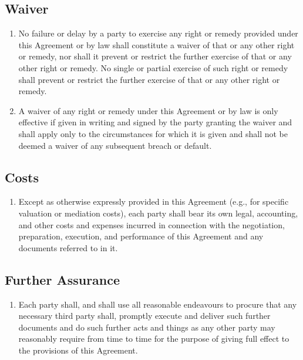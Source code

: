 \subsection{Waiver}
\begin{enumerate}[label=(\alph*)]
\item No failure or delay by a party to exercise any right or remedy provided under this Agreement or by law shall constitute a waiver of that or any other right or remedy, nor shall it prevent or restrict the further exercise of that or any other right or remedy. No single or partial exercise of such right or remedy shall prevent or restrict the further exercise of that or any other right or remedy.
\item A waiver of any right or remedy under this Agreement or by law is only effective if given in writing and signed by the party granting the waiver and shall apply only to the circumstances for which it is given and shall not be deemed a waiver of any subsequent breach or default.
\end{enumerate}

\subsection{Costs}
\begin{enumerate}[label=(\alph*)]
\item Except as otherwise expressly provided in this Agreement (e.g., for specific valuation or mediation costs), each party shall bear its own legal, accounting, and other costs and expenses incurred in connection with the negotiation, preparation, execution, and performance of this Agreement and any documents referred to in it.
\end{enumerate}

\subsection{Further Assurance}
\begin{enumerate}[label=(\alph*)]
\item Each party shall, and shall use all reasonable endeavours to procure that any necessary third party shall, promptly execute and deliver such further documents and do such further acts and things as any other party may reasonably require from time to time for the purpose of giving full effect to the provisions of this Agreement.
\end{enumerate}

